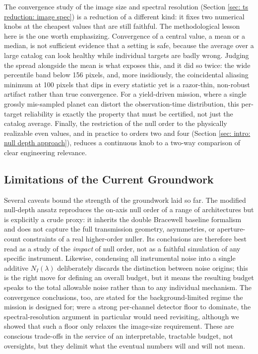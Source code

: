 \documentclass[12pt,a4paper]{article}
\numberwithin{equation}{section}
\numberwithin{figure}{section}
\numberwithin{table}{section}
\begin{document}
The convergence study of the image size and spectral resolution (Section \ref{sec: ts reduction: image spec}) is a reduction of a different kind: it fixes two numerical knobs at the cheapest values that are still faithful. The methodological lesson here is the one worth emphasizing. Convergence of a central value, a mean or a median, is not sufficient evidence that a setting is safe, because the average over a large catalog can look healthy while individual targets are badly wrong. Judging the spread alongside the mean is what exposes this, and it did so twice: the wide percentile band below 156 pixels, and, more insidiously, the coincidental aliasing minimum at 100 pixels that dips in every statistic yet is a razor-thin, non-robust artifact rather than true convergence. For a yield-driven mission, where a single grossly mis-sampled planet can distort the observation-time distribution, this per-target reliability is exactly the property that must be certified, not just the catalog average. Finally, the restriction of the null order to the physically realizable even values, and in practice to orders two and four (Section \ref{sec: intro: null depth approach}), reduces a continuous knob to a two-way comparison of clear engineering relevance.

\subsection{Limitations of the Current Groundwork}
Several caveats bound the strength of the groundwork laid so far. The modified null-depth ansatz reproduces the on-axis null order of a range of architectures but is explicitly a crude proxy: it inherits the double Bracewell baseline formalism and does not capture the full transmission geometry, asymmetries, or aperture-count constraints of a real higher-order nuller. Its conclusions are therefore best read as a study of the \textit{impact} of null order, not as a faithful simulation of any specific instrument. Likewise, condensing all instrumental noise into a single additive $N_I(\lambda)$ deliberately discards the distinction between noise origins; this is the right move for defining an overall budget, but it means the resulting budget speaks to the total allowable noise rather than to any individual mechanism. The convergence conclusions, too, are stated for the background-limited regime the mission is designed for; were a strong per-channel detector floor to dominate, the spectral-resolution argument in particular would need revisiting, although we showed that such a floor only relaxes the image-size requirement. These are conscious trade-offs in the service of an interpretable, tractable budget, not oversights, but they delimit what the eventual numbers will and will not mean.
\end{document}
